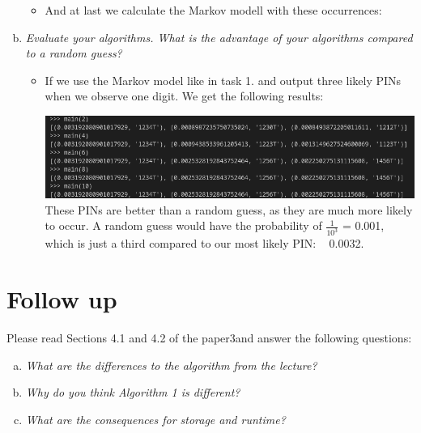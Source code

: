 \begin{enumerate}[(a)]
\begin{itemize}
        \item And at last we calculate the Markov modell with these occurrences:
        

    \end{itemize}

    \item {\itshape Evaluate  your  algorithms.  What  is  the  advantage  of  your  algorithms compared to a random guess?}
    \begin{itemize}
        \item If we use the Markov model like in task 1. and output three likely PINs when we observe one digit. We get the following results: 
        
        \includegraphics[width=\linewidth]{src/u5/output3.png}
        \\ These PINs are better than a random guess, as they are much more likely to occur. A random guess would have the probability of $\frac{1}{10^{3}}$ = 0.001, which is just a third compared to our most likely PIN: ~ 0.0032.  
        
    \end{itemize}

\end{enumerate}


\section{Follow up}


Please read Sections 4.1 and 4.2 of the paper3and answer the following questions:
\begin{enumerate}[(a)]
    
    \item {\itshape What are the differences to the algorithm from the lecture?}
    
    
    \item {\itshape Why do you think Algorithm 1 is different?}


    \item {\itshape What are the consequences for storage and runtime?}

\end{enumerate}


